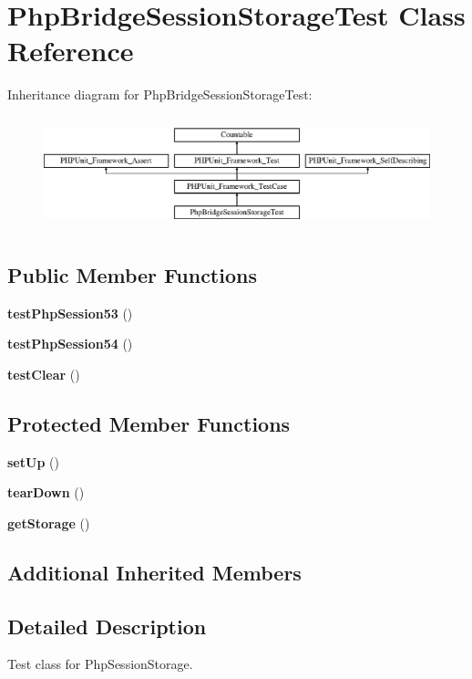 \section{Php\+Bridge\+Session\+Storage\+Test Class Reference}
\label{class_symfony_1_1_component_1_1_http_foundation_1_1_tests_1_1_session_1_1_storage_1_1_php_bridge_session_storage_test}
Inheritance diagram for Php\+Bridge\+Session\+Storage\+Test\+:\begin{figure}[H]
\begin{center}
\leavevmode
\includegraphics[height=3.303835cm]{class_symfony_1_1_component_1_1_http_foundation_1_1_tests_1_1_session_1_1_storage_1_1_php_bridge_session_storage_test}
\end{center}
\end{figure}
\subsection*{Public Member Functions}
\begin{DoxyCompactItemize}
\item 
{\bf test\+Php\+Session53} ()
\item 
{\bf test\+Php\+Session54} ()
\item 
{\bf test\+Clear} ()
\end{DoxyCompactItemize}
\subsection*{Protected Member Functions}
\begin{DoxyCompactItemize}
\item 
{\bf set\+Up} ()
\item 
{\bf tear\+Down} ()
\item 
{\bf get\+Storage} ()
\end{DoxyCompactItemize}
\subsection*{Additional Inherited Members}


\subsection{Detailed Description}
Test class for Php\+Session\+Storage.

